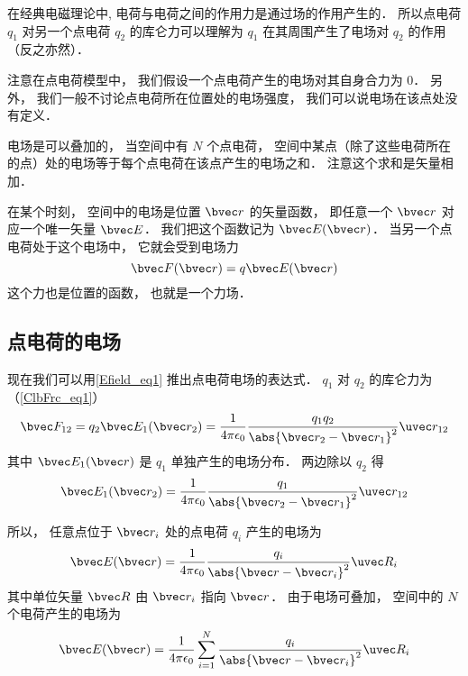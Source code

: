 
在经典电磁理论中, 电荷与电荷之间的作用力是通过场的作用产生的． 所以点电荷 $q_1$ 对另一个点电荷 $q_2$ 的库仑力可以理解为 $q_1$ 在其周围产生了电场对 $q_2$ 的作用（反之亦然）．

注意在点电荷模型中， 我们假设一个点电荷产生的电场对其自身合力为 0． 另外， 我们一般不讨论点电荷所在位置处的电场强度， 我们可以说电场在该点处没有定义．

电场是可以叠加的， 当空间中有 $N$ 个点电荷， 空间中某点（除了这些电荷所在的点）处的电场等于每个点电荷在该点产生的电场之和． 注意这个求和是矢量相加．

在某个时刻， 空间中的电场是位置 $\bvec r$ 的矢量函数， 即任意一个 $\bvec r$ 对应一个唯一矢量 $\bvec E$． 我们把这个函数记为 $\bvec E(\bvec r)$． 当另一个点电荷处于这个电场中， 它就会受到电场力
\begin{equation}\label{Efield_eq1}
\bvec F(\bvec r) = q \bvec E(\bvec r)
\end{equation}
这个力也是位置的函数， 也就是一个力场．

\subsection{点电荷的电场}
现在我们可以用\autoref{Efield_eq1} 推出点电荷电场的表达式． $q_1$ 对 $q_2$ 的库仑力为（\autoref{ClbFrc_eq1}）
\begin{equation}\label{Efield_eq3}
\bvec F_{12} = q_2 \bvec E_1(\bvec r_2) = \frac{1}{4\pi\epsilon_0}\frac{q_1 q_2}{\abs{\bvec r_2 - \bvec r_1}^2} \uvec r_{12}
\end{equation}
其中 $\bvec E_1(\bvec r)$ 是 $q_1$ 单独产生的电场分布． 两边除以 $q_2$ 得
\begin{equation}
\bvec E_1(\bvec r_2) = \frac{1}{4\pi\epsilon_0}\frac{q_1}{\abs{\bvec r_2 - \bvec r_1}^2} \uvec r_{12}
\end{equation}

所以， 任意点位于 $\bvec r_i$ 处的点电荷 $q_i$ 产生的电场为
\begin{equation}
\bvec E(\bvec r) = \frac{1}{4\pi\epsilon_0}\frac{q_i}{\abs{\bvec r - \bvec r_i}^2} \uvec R_i
\end{equation}
其中单位矢量 $\bvec R$ 由 $\bvec r_i$ 指向 $\bvec r$． 由于电场可叠加， 空间中的 $N$ 个电荷产生的电场为
\begin{equation}\label{Efield_eq2}
\bvec E(\bvec r) = \frac{1}{4\pi\epsilon_0} \sum_{i=1}^N \frac{q_i}{\abs{\bvec r - \bvec r_i}^2} \uvec R_i
\end{equation}

